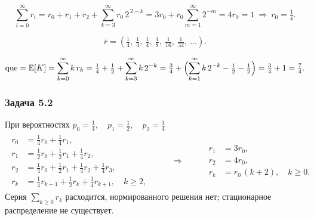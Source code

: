 \[
	\sum_{i=0}^\infty r_i = r_0+r_1+r_2+\sum_{k=3}^\infty r_0\,2^{\,2-k}
	=3r_0+r_0\!\sum_{m=1}^\infty 2^{-m}=4r_0=1
	\ \Rightarrow\ r_0=\tfrac14.
\]


\[
	\overline r = \left(\tfrac{1}{4},\ \tfrac{1}{4},\ \tfrac{1}{4},\ \tfrac{1}{8},\ \tfrac{1}{16},\ \tfrac{1}{32},\ \ldots\right).
\]

\[
	\mathrm{que}=\mathbb E[K]=\sum_{k=0}^\infty k\,r_k
	=\tfrac14+\tfrac12+\sum_{k=3}^\infty k\,2^{-k}
	=\tfrac34+\Bigl(\sum_{k=1}^\infty k\,2^{-k}-\tfrac12-\tfrac12\Bigr)
	=\tfrac34+1=\tfrac{7}{4}.
\]

\subsubsection*{Задача 5.2}

При вероятностях $p_0=\tfrac{1}{4},\quad p_1=\tfrac{1}{2},\quad p_2=\tfrac{1}{4}$
\[
	\begin{array}{rcl}
		\begin{aligned}
			r_0 & = \tfrac{1}{4} r_0 + \tfrac{1}{4} r_1,                                           \\
			r_1 & = \tfrac{1}{2} r_0 + \tfrac{1}{2} r_1 + \tfrac{1}{4} r_2,                        \\
			r_2 & = \tfrac{1}{4} r_0 + \tfrac{1}{2} r_1 + \tfrac{1}{4} r_2 + \tfrac{1}{4} r_3,     \\
			r_k & = \tfrac{1}{4} r_{k-1} + \tfrac{1}{2} r_k + \tfrac{1}{4} r_{k+1}, \quad k \ge 2,
		\end{aligned}
		 & \qquad \Rightarrow \qquad &
		\begin{aligned}
			r_1 & = 3r_0,                    \\
			r_2 & = 4r_0,                    \\
			r_k & = r_0\,(k+2),\quad k\ge 0.
		\end{aligned}
	\end{array}
\]
Серия \(\sum_{k\ge0} r_k\) расходится, нормированного решения нет; стационарное распределение не существует.
